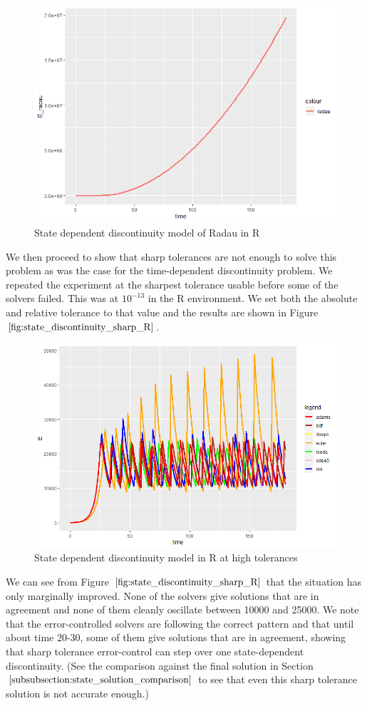 \begin{figure}[h]
\centering
\includegraphics[width=0.7\linewidth]{./figures/state_discontinuity_radau_R}
\caption{State dependent discontinuity model of Radau in R}
\label{fig:state_discontinuity_radau_R}
\end{figure}

We then proceed to show that sharp tolerances are not enough to solve this problem as was the case for the time-dependent discontinuity problem. We repeated the experiment at the sharpest tolerance usable before some of the solvers failed. This was at $10^{-13}$ in the R environment. We set both the absolute and relative tolerance to that value and the results are shown in Figure $\ref{fig:state_discontinuity_sharp_R}$.

\begin{figure}[h]
\centering
\includegraphics[width=0.7\linewidth]{./figures/state_discontinuity_sharp_R}
\caption{State dependent discontinuity model in R at high tolerances}
\label{fig:state_discontinuity_sharp_R}
\end{figure}

We can see from Figure $\ref{fig:state_discontinuity_sharp_R}$ that the situation has only marginally improved. None of the solvers give solutions that are in agreement and none of them cleanly oscillate between 10000 and 25000. We note that the error-controlled solvers are following the correct pattern and that until about time 20-30, some of them give solutions that are in agreement, showing that sharp tolerance error-control can step over one state-dependent discontinuity. (See the comparison against the final solution in Section $\ref{subsubsection:state_solution_comparison}$ to see that even this sharp tolerance solution is not accurate enough.)

